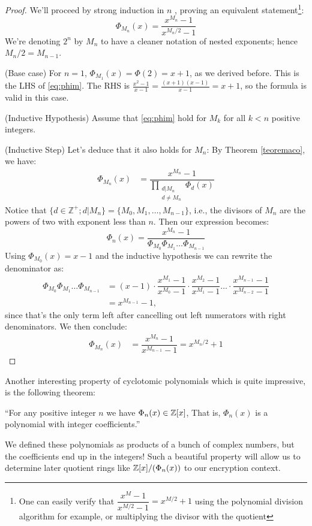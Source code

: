 \begin{proof}
We'll proceed by strong induction in $n$ \cite{herstein1996abstract},  proving an equivalent statement\footnote{One can easily verify that $\dfrac{x^{M}-1}{x^{M/2}-1} = x^{M/2}+1$ using the polynomial division algorithm for example, or multiplying the divisor with the quotient}: 
\begin{equation}
\label{eq:phim}
    \Phi_{M_n}(x) = \dfrac{x^{M_n}-1}{x^{M_n/2}-1}
\end{equation}
We're denoting $2^n$ by $M_n$ to have a cleaner notation of nested exponents; hence $M_n/2=M_{n-1}$.

(Base case) For $n=1$, $\Phi_{M_1}(x)=\Phi(2)=x+1$, as we derived before. This is the LHS of \ref{eq:phim}. The RHS is $\frac{x^2-1}{x-1}=\frac{(x+1)(x-1)}{x-1}=x+1$, so the formula is valid in this case.

(Inductive Hypothesis) Assume that \ref{eq:phim} hold for $M_k$ for all $k<n$ positive integers.

(Inductive Step) Let's deduce that it also holds for $M_n$: By Theorem  \ref{teoremaco}, we have:
\begin{align*}
    \Phi_{M_n}(x) &= \dfrac{x^{M_n}-1}{\displaystyle\prod_{\substack{d|M_n\\d\neq M_n}}\Phi_d(x)}
\end{align*}
Notice that $\{d\in\mathbb{Z}^+;d|M_n\} = \{M_0,M_1,\ldots,M_{n-1}\}$, i.e., the divisors of $M_n$ are the powers of two with exponent less than $n$. Then our expression becomes:
$$\Phi_n(x) = \dfrac{x^{M_n}-1}{\Phi_{M_0}\Phi_{M_1}\ldots\Phi_{M_{n-1}}}$$
Using $\Phi_{M_0}(x)=x-1$ and the inductive hypothesis we can rewrite the denominator as:
\begin{align*}\Phi_{M_0}\Phi_{M_1}\ldots\Phi_{M_{n-1}}&=(x-1)\cdot \dfrac{x^{M_1}-1}{x^{M_0}-1}\cdot\dfrac{x^{M_2}-1}{x^{M_{1}}-1}\ldots\cdot\dfrac{x^{M_{n-1}}-1}{x^{M_{n-2}}-1}\\&=x^{M_{n-1}}-1,\end{align*}
since that's the only term left after cancelling out left numerators with right denominators. We then conclude:
\begin{align*}
    \Phi_{M_n}(x) &= \dfrac{x^{M_n}-1}{x^{M_{n-1}}-1}=x^{M_n/2}+1
\end{align*}
\end{proof}

Another interesting property of cyclotomic polynomials which is quite impressive, is the following theorem:
\begin{theorem}
``For any positive integer $n$ we have $\Phi_n(x)\in\mathbb{Z}[x]$, That is, $\Phi_n(x)$ is a polynomial
with integer coefficients.''\cite{sun2013cyclotomic}
\end{theorem}
We defined these polynomials as products of a bunch of complex numbers, but the coefficients end up in the integers! Such a beautiful property will allow us to determine later quotient rings like $\mathbb{Z}[x]/(\Phi_n(x))$ to our encryption context.

